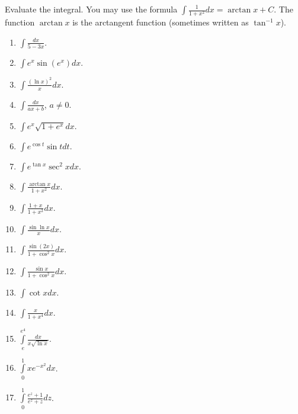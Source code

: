 Evaluate the integral. You may use the formula $\int \frac{1}{1+x^2}dx=\arctan x+C $. The function $\arctan x$ is the arctangent function (sometimes written as $\tan^{-1}x$).
\begin{multicols}{3}
\begin{enumerate}
\item $\displaystyle\int \frac{dx}{5-3x}$.
\item $\displaystyle\int e^x\sin (e^x) dx$.
\item $\displaystyle\int \frac{(\ln x)^2}{x} dx$.
\item $\displaystyle\int \frac{dx}{ax+b} $, $a\neq 0$.
\item $\displaystyle\int e^x\sqrt{1+e^x} dx$.
\item $\displaystyle\int e^{\cos t }\sin t dt$.
\item $\displaystyle\int e^{\tan x}\sec^2x dx$.
\item $\displaystyle\int \frac{\arctan x}{1+x^2} dx$. 
\item $\displaystyle\int \frac{1+x}{1+x^2} dx$. 
\item $\displaystyle\int \frac{\sin \ln x}{x} dx$.
\item $\displaystyle\int \frac{\sin (2x)}{1+\cos^2x}dx$.
\item $\displaystyle\int \frac{\sin x}{1+\cos^2 x} dx$.
\item $\displaystyle\int \cot x dx$.
\item $\displaystyle\int \frac{x}{1+x^4}dx$.
\item $\displaystyle\int\limits_{e}^{e^4}\frac{dx}{x\sqrt{\ln x}} $.
\item $\displaystyle\int\limits_{0}^{1}xe^{-x^2} dx$.
\item $\displaystyle\int\limits_{0}^{1}\frac{e^z+1}{e^z+z} dz$.
\end{enumerate}
\end{multicols}